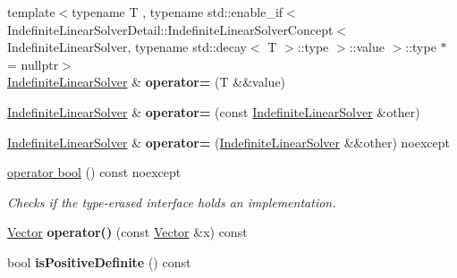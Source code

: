 \begin{DoxyCompactItemize}
\item 
\hypertarget{classSpacy_1_1IndefiniteLinearSolver_a6ed5d50bdf25e31ea81a3aaa0c35dd8e}{{\footnotesize template$<$typename T , typename std\-::enable\-\_\-if$<$ Indefinite\-Linear\-Solver\-Detail\-::\-Indefinite\-Linear\-Solver\-Concept$<$ Indefinite\-Linear\-Solver, typename std\-::decay$<$ T $>$\-::type $>$\-::value $>$\-::type $\ast$  = nullptr$>$ }\\\hyperlink{classSpacy_1_1IndefiniteLinearSolver}{\-Indefinite\-Linear\-Solver} \& {\bfseries operator=} (\-T \&\&value)}\label{classSpacy_1_1IndefiniteLinearSolver_a6ed5d50bdf25e31ea81a3aaa0c35dd8e}

\item 
\hypertarget{classSpacy_1_1IndefiniteLinearSolver_a45976eb9a9a9884fabdcb121807d944f}{\hyperlink{classSpacy_1_1IndefiniteLinearSolver}{\-Indefinite\-Linear\-Solver} \& {\bfseries operator=} (const \hyperlink{classSpacy_1_1IndefiniteLinearSolver}{\-Indefinite\-Linear\-Solver} \&other)}\label{classSpacy_1_1IndefiniteLinearSolver_a45976eb9a9a9884fabdcb121807d944f}

\item 
\hypertarget{classSpacy_1_1IndefiniteLinearSolver_a9545a7e978179a546525b18a16b8ae61}{\hyperlink{classSpacy_1_1IndefiniteLinearSolver}{\-Indefinite\-Linear\-Solver} \& {\bfseries operator=} (\hyperlink{classSpacy_1_1IndefiniteLinearSolver}{\-Indefinite\-Linear\-Solver} \&\&other) noexcept}\label{classSpacy_1_1IndefiniteLinearSolver_a9545a7e978179a546525b18a16b8ae61}

\item 
\hyperlink{classSpacy_1_1IndefiniteLinearSolver_a4ef57ec75c5f8cf611a99e80fe1a492d}{operator bool} () const noexcept
\begin{DoxyCompactList}\small\item\em \-Checks if the type-\/erased interface holds an implementation. \end{DoxyCompactList}\item 
\hypertarget{classSpacy_1_1IndefiniteLinearSolver_a150a854c97a44c1c53c4aa071e1b8b12}{\hyperlink{classSpacy_1_1Vector}{\-Vector} {\bfseries operator()} (const \hyperlink{classSpacy_1_1Vector}{\-Vector} \&x) const }\label{classSpacy_1_1IndefiniteLinearSolver_a150a854c97a44c1c53c4aa071e1b8b12}

\item 
\hypertarget{classSpacy_1_1IndefiniteLinearSolver_a04191e6ed2c8cd54870c79a919dcae39}{bool {\bfseries is\-Positive\-Definite} () const }\label{classSpacy_1_1IndefiniteLinearSolver_a04191e6ed2c8cd54870c79a919dcae39}


\end{DoxyCompactItemize}
